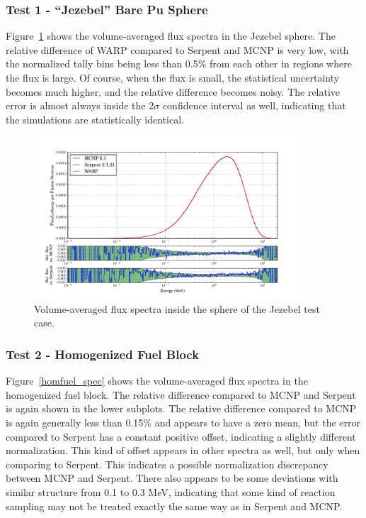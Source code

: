 \documentclass[preprint,12pt]{elsarticle}
\begin{document}
\newpage
\subsubsection{Test 1 - ``Jezebel'' Bare Pu Sphere}

Figure~\ref{jezebel_spec} shows the volume-averaged flux spectra in the Jezebel sphere.  The relative difference of WARP compared to Serpent and MCNP is very low, with the normalized tally bins being less than 0.5\% from each other in regions where the flux is large.  Of course, when the flux is small, the statistical uncertainty becomes much higher, and the relative difference becomes noisy.   The relative error is almost always inside the 2$\sigma$ confidence interval as well, indicating that the simulations are statistically identical.  

\begin{figure}[!htbp]
\centering
\includegraphics[width=0.9\textwidth,trim= 1cm 0cm 1cm 0cm]{graphics/jezebel_spec.pdf}
\caption{Volume-averaged flux spectra inside the sphere of the Jezebel test case. \label{jezebel_spec} }
\end{figure}

\newpage
\subsubsection{Test 2 - Homogenized Fuel Block}

Figure~\ref{homfuel_spec} shows the volume-averaged flux spectra in the homogenized fuel block.  The relative difference compared to MCNP and Serpent is again shown in the lower subplots.  The relative difference compared to MCNP is again generally less than 0.15\% and appears to have a zero mean, but the error compared to Serpent has a constant positive offset, indicating a slightly different normalization.  This kind of offset appears in other spectra as well, but only when comparing to Serpent.  This indicates a possible normalization discrepancy between MCNP and Serpent.  There also appears to be some  deviations with similar structure from 0.1 to 0.3 MeV, indicating that some kind of reaction sampling may not be treated exactly the same way as in Serpent and MCNP.
\end{document}
